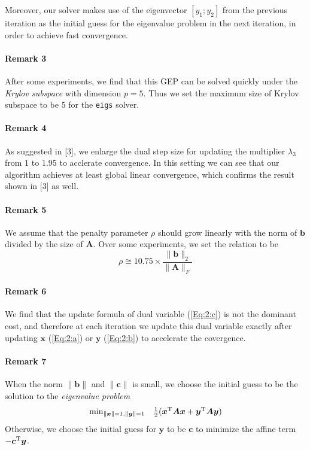Moreover, our solver makes use of the eigenvector $[y_1;y_2]$ from the previous iteration as the initial guess for the eigenvalue problem in the next iteration, in order to achieve fast convergence.

\paragraph{Remark 3}

After some experiments, we find that this GEP can be solved quickly under the \emph{Krylov subspace} with dimension $p=5$. Thus we set the maximum size of Krylov subspace to be 5 for the \texttt{eigs} solver.


\paragraph{Remark 4}
As suggested in [3], we enlarge the dual step size for updating the multiplier $\lambda_3$ from $1$ to $1.95$ to acclerate convergence. In this setting we can see that our algorithm achieves at least global linear convergence, which confirms the result shown in [3] as well.

\paragraph{Remark 5}
We assume that the penalty parameter $\rho$ should grow linearly with the norm of $\bm b$ divided by the size of $\bm A$. Over some experiments, we set the relation to be 
\[
\rho \cong 10.75\times\frac{\|\bm b\|_2}{\|\bm A\|_F}
\]
\paragraph{Remark 6}
We find that the update formula of dual variable (\ref{Eq:2:c}) is not the dominant cost, and therefore at each iteration we update this dual variable exactly after updating $\bm x$ (\ref{Eq:2:a}) or $\bm y$ (\ref{Eq:2:b}) to accelerate the covergence.

\paragraph{Remark 7}
When the norm $\|\bm b\|$ and $\|\bm c\|$ is small, we choose the initial guess to be the solution to the \emph{eigenvalue problem}
\[
\begin{array}{ll}
\min_{\|\bm x\|=1,\|\bm y\|=1}&\frac{1}{2}(\bm x^{\mathrm T}\bm A\bm x+\bm y^{\mathrm T}\bm A\bm y)\\
\end{array}
\]
Otherwise, we choose the initial guess for $\bm y$ to be $\bm c$ to minimize the affine term $-\bm c^{\mathrm T}\bm y$.

